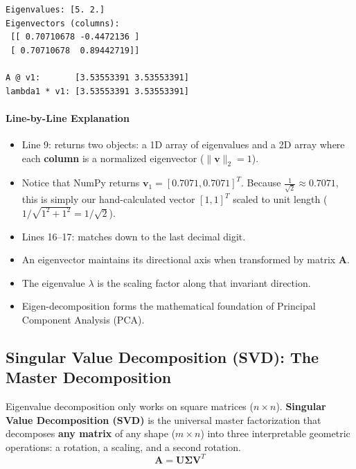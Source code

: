 \begin{lstlisting}[style=outputstyle]
Eigenvalues: [5. 2.]
Eigenvectors (columns):
 [[ 0.70710678 -0.4472136 ]
 [ 0.70710678  0.89442719]]

A @ v1:       [3.53553391 3.53553391]
lambda1 * v1: [3.53553391 3.53553391]
\end{lstlisting}

\paragraph{Line-by-Line Explanation}
\begin{itemize}
    \item Line 9:  returns two objects: a 1D array of eigenvalues and a 2D array where each \textbf{column} is a normalized eigenvector ($\|\mathbf{v}\|_2 = 1$).
    \item Notice that NumPy returns $\mathbf{v}_1 = [0.7071, 0.7071]^T$. Because $\frac{1}{\sqrt{2}} \approx 0.7071$, this is simply our hand-calculated vector $[1, 1]^T$ scaled to unit length ($1 / \sqrt{1^2 + 1^2} = 1 / \sqrt{2}$).
    \item Lines 16--17:  matches  down to the last decimal digit.
\end{itemize}

\begin{takeaways}
\begin{itemize}
    \item An eigenvector maintains its directional axis when transformed by matrix $\mathbf{A}$.
    \item The eigenvalue $\lambda$ is the scaling factor along that invariant direction.
    \item Eigen-decomposition forms the mathematical foundation of Principal Component Analysis (PCA).
\end{itemize}
\end{takeaways}

\subsection{Singular Value Decomposition (SVD): The Master Decomposition}

\begin{keyidea}
Eigenvalue decomposition only works on square matrices ($n \times n$). \textbf{Singular Value Decomposition (SVD)} is the universal master factorization that decomposes \textbf{any matrix} of any shape ($m \times n$) into three interpretable geometric operations: a rotation, a scaling, and a second rotation.
\begin{equation}
\mathbf{A} = \mathbf{U} \mathbf{\Sigma} \mathbf{V}^T\label{eq:svd}
\end{equation}
\end{keyidea}

